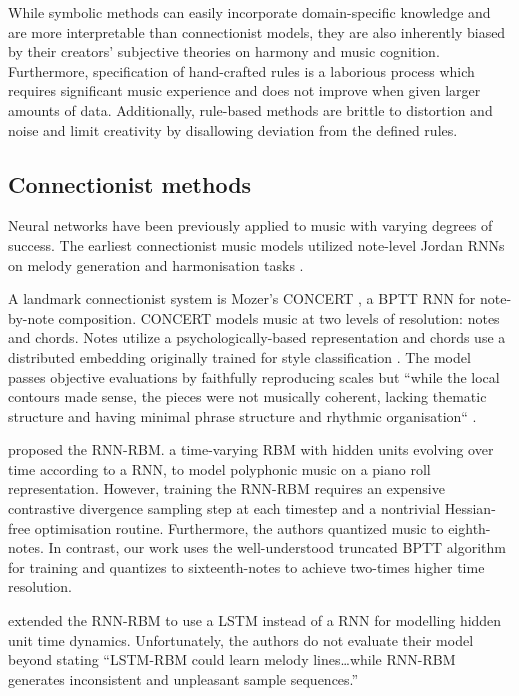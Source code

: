 \documentclass[dissertation.tex]{subfiles}
\begin{document}
While symbolic methods can easily incorporate domain-specific knowledge and are
more interpretable than connectionist models, they are also inherently biased
by their creators' subjective theories on harmony and music cognition.
Furthermore, specification of hand-crafted rules is a laborious process which
requires significant music experience and does not improve when given larger
amounts of data. Additionally, rule-based methods are brittle to distortion and
noise and limit creativity by disallowing deviation from the defined rules.

\subsection{Connectionist methods}

Neural networks have been previously applied to music with varying degrees of
success\cite{griffith1999musical}. The earliest connectionist music models
utilized note-level Jordan RNNs on melody generation and harmonisation tasks
\cite{todd1988sequential} \cite{todd1989connectionist}
\cite{bharucha1989modeling}. 

A landmark connectionist system is Mozer's CONCERT \cite{mozer1994neural}, a
BPTT RNN for note-by-note composition. CONCERT models music at two
levels of resolution: notes and chords. Notes utilize a psychologically-based
representation \cite{shepard1982geometrical} and chords use a distributed
embedding originally trained for style classification
\cite{laden1989representation}. The model passes objective evaluations by
faithfully reproducing scales but ``while the local contours made sense, the
pieces were not musically coherent, lacking thematic structure and having
minimal phrase structure and rhythmic organisation`` \cite{mozer1994neural}.

\cite{Boulanger-Lewandowski2012} proposed the RNN-RBM. a time-varying RBM with
hidden units evolving over time according to a RNN, to model polyphonic music
on a piano roll representation. However, training the RNN-RBM requires an
expensive contrastive divergence sampling step at each timestep and a
nontrivial Hessian-free optimisation routine. Furthermore, the authors
quantized music to eighth-notes. In contrast, our work uses the well-understood
truncated BPTT algorithm for training and quantizes to sixteenth-notes to achieve
two-times higher time resolution.

\cite{Lyu2015} extended the RNN-RBM\cite{Boulanger-Lewandowski2012} to use a
LSTM instead of a RNN for modelling hidden unit time dynamics. Unfortunately,
the authors do not evaluate their model beyond stating ``LSTM-RBM could learn
melody lines\ldots while RNN-RBM generates inconsistent and unpleasant sample
sequences.''
\end{document}
